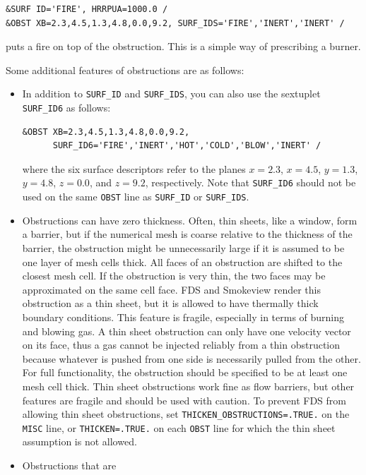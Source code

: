 \documentclass[11pt]{book}
\newcommand{\ct}{\tt\small}
\begin{document}
\footnotesize
\begin{verbatim}
&SURF ID='FIRE', HRRPUA=1000.0 /
&OBST XB=2.3,4.5,1.3,4.8,0.0,9.2, SURF_IDS='FIRE','INERT','INERT' /
\end{verbatim}
\normalsize

\noindent
puts a fire on top of the obstruction. This is a simple way of
prescribing a burner.

\vspace{\baselineskip}
\noindent
Some additional features of obstructions are as follows:
\begin{itemize}
\item In addition to {\ct SURF\_ID} and {\ct SURF\_IDS}, you can also use
the sextuplet {\ct SURF\_ID6} as follows:

\footnotesize
\begin{verbatim}
&OBST XB=2.3,4.5,1.3,4.8,0.0,9.2,
      SURF_ID6='FIRE','INERT','HOT','COLD','BLOW','INERT' /
\end{verbatim}
\normalsize
where the six surface descriptors refer to the planes $x=2.3$, $x=4.5$, $y=1.3$, $y=4.8$,
$z=0.0$, and $z=9.2$, respectively.
Note that {\ct SURF\_ID6} should not be used on the same {\ct OBST}
line as {\ct SURF\_ID} or {\ct SURF\_IDS}.
\item Obstructions can have zero thickness. Often, thin sheets, like a window, form a barrier,
but if the numerical mesh is coarse relative to the thickness of the barrier, the obstruction
might be unnecessarily large if it is assumed to be one layer of mesh cells thick. All faces
of an obstruction are shifted to the closest mesh cell. If the obstruction is very thin, the two
faces may be approximated on the same cell face. FDS and Smokeview render
this obstruction as a thin sheet, but it is allowed to have thermally
thick boundary conditions. This feature is fragile, especially in terms
of burning and blowing gas. A thin sheet obstruction can only have one velocity
vector on its face, thus a gas cannot be injected reliably from a
thin obstruction because whatever is pushed from one side is necessarily pulled from the other.
For full functionality, the obstruction should be specified to
be at least one mesh cell thick. Thin sheet obstructions
work fine as flow barriers, but other features are fragile and should be used with
caution. To prevent FDS from allowing thin sheet obstructions, set {\ct THICKEN\_OBSTRUCTIONS=.TRUE.} on the
{\ct MISC} line, or {\ct THICKEN=.TRUE.} on each {\ct OBST} line for which the thin sheet assumption is not allowed.
\item Obstructions that are

\end{itemize}
\end{document}
